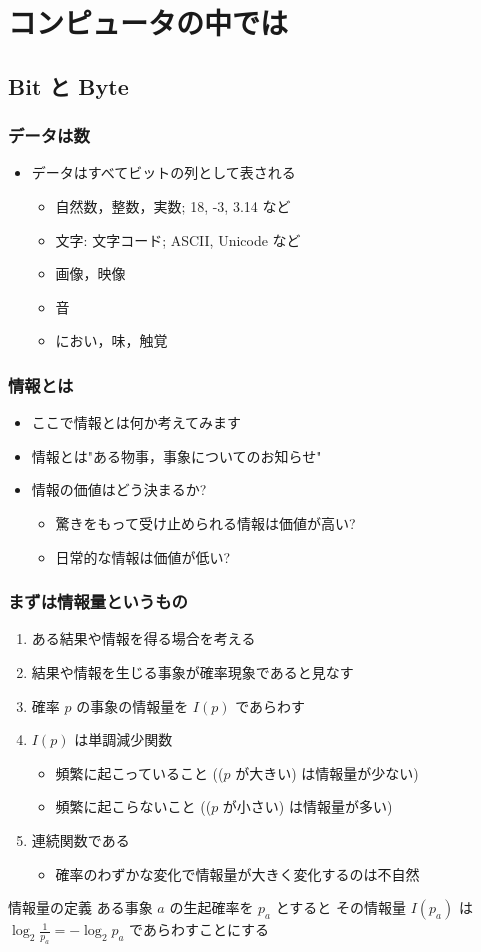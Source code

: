 \section{コンピュータの中では}
\subsection{Bit と Byte}
\begin{frame}
\frametitle{データは数}
  \begin{itemize}
\item データはすべてビットの列として表される
    \begin{itemize}
\item 自然数，整数，実数; 18, -3, 3.14 など
\item 文字: 文字コード; ASCII, Unicode など
\item 画像，映像
\item 音
\item におい，味，触覚
    \end{itemize}
  \end{itemize}
\end{frame}
%
%
\begin{frame}
\frametitle{情報とは}
  \begin{itemize}
\item ここで情報とは何か考えてみます
\item 情報とは"ある物事，事象についてのお知らせ"
\item 情報の価値はどう決まるか?
    \begin{itemize}
\item 驚きをもって受け止められる情報は価値が高い?
\item 日常的な情報は価値が低い?
    \end{itemize}
  \end{itemize}
\end{frame}
\begin{frame}
\frametitle{まずは情報量というもの}
  \begin{enumerate}
\item ある結果や情報を得る場合を考える
\item 結果や情報を生じる事象が確率現象であると見なす
\item 確率 $p$ の事象の情報量を \(I(p)\) であらわす
\item \(I(p)\) は単調減少関数
    \begin{itemize}
\item 頻繁に起こっていること ((\(p\) が大きい) は情報量が少ない)
\item 頻繁に起こらないこと ((\(p\) が小さい) は情報量が多い)
    \end{itemize}
\item 連続関数である
    \begin{itemize}
\item 確率のわずかな変化で情報量が大きく変化するのは不自然
    \end{itemize}
  \end{enumerate}
  \begin{block}{情報量の定義}
ある事象 $a$ の生起確率を \(p_a\) とすると
その情報量 \(I(p_a)\) は \(\log_{2}\frac{1}{p_a}=-\log_{2}p_a\) であらわすことにする
  \end{block}
\end{frame}
